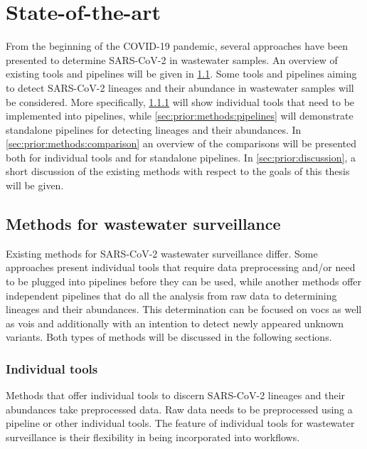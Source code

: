 %
\section{State-of-the-art}

From the beginning of the COVID-19 pandemic, several approaches have been presented to determine SARS-CoV-2 in wastewater samples. An overview of existing tools and pipelines will be given in \cref{sec:prior:methods}. Some tools and pipelines aiming to detect SARS-CoV-2 lineages and their abundance in wastewater samples will be considered. More specifically, \cref{sec:prior:methods:tools} will show individual tools that need to be implemented into pipelines, while \cref{sec:prior:methods:pipelines} will demonstrate standalone pipelines for detecting lineages and their abundances. In \cref{sec:prior:methods:comparison} an overview of the comparisons will be presented both for individual tools and for standalone pipelines. In \cref{sec:prior:discussion}, a short discussion of the existing methods with respect to the goals of this thesis will be given.

    \subsection{Methods for wastewater surveillance} \label{sec:prior:methods}
    Existing methods for SARS-CoV-2 wastewater surveillance differ. Some approaches present individual tools that require data preprocessing and/or need to be plugged into pipelines before they can be used, while another methods offer independent pipelines that do all the analysis from raw data to determining lineages and their abundances. This determination can be focused on \acrfull{vocs} as well as \acrfull{vois} and additionally with an intention to detect newly appeared unknown variants. Both types of methods will be discussed in the following sections.
    
        \subsubsection{Individual tools} \label{sec:prior:methods:tools}
        Methods that offer individual tools to discern SARS-CoV-2 lineages and their abundances take preprocessed data. Raw data needs to be preprocessed using a pipeline or other individual tools. The feature of individual tools for wastewater surveillance is their flexibility in being incorporated into workflows.

